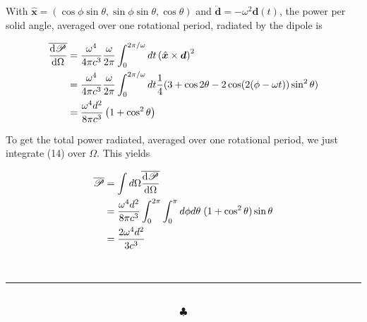 \documentclass[]{article}
\begin{document}
With $\hat{\bm{x}} = (\cos\phi\sin\theta, \sin\phi\sin\theta, \cos\theta)$ and $ \ddot{\bm{d}} = - \omega^2 \bm{d}(t)$, the power per solid angle, averaged over one rotational period, radiated by the dipole is

\begin{equation}
\begin{split}
\overline{\dv{\mathscr{P}}{\Omega}} & = \frac{\omega^4}{4\pi c^3}  \frac{\omega}{2\pi} \int_{0}^{2\pi/\omega} dt  \left(   \hat{\bm{x}} \times \bm{d}  \right)^2 \\
& =  \frac{\omega^4}{4\pi c^3}  \frac{\omega}{2\pi} \int_{0}^{2\pi/\omega} dt \frac{1}{4}(3 + \cos 2\theta - 2\cos(2(\phi - \omega t))\sin^2\theta    ) \\
& = \frac{ \omega^4 d^2}{8 \pi c^3} \left(  1 + \cos^2\theta \right) \\
\end{split}
\end{equation}

To get the total power radiated, averaged over one rotational period, we just integrate (14) over $\Omega$. This yields

\begin{equation}
\begin{split}
\overline{\mathscr{P}} & = \int d\Omega \overline{\dv{\mathscr{P}}{\Omega}} \\
& =  \frac{ \omega^4 d^2}{8 \pi c^3} \int_0^{2\pi} \int_0^\pi d\phi d\theta\;   (1 + \cos^2\theta )\sin\theta  \\
& = \frac{2  \omega^4  d^2}{3 c^3} \\
\end{split}
\end{equation}










\hfill \\
\noindent\rule{15cm}{0.4pt} \\







$$\clubsuit$$
\end{document}
